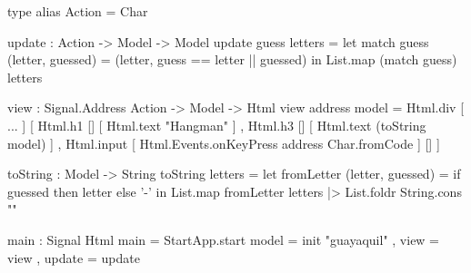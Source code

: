 \documentclass[spanish]{beamer}
\begin{document}

\begin{frame}[fragile]
  \begin{code}
type alias Action =
  Char
  \end{code}
\end{frame}


\begin{frame}[fragile]
  \begin{code}
update : Action -> Model -> Model
update guess letters =
  let
    match guess (letter, guessed) =
      (letter, guess == letter || guessed)
  in
    List.map (match guess) letters
  \end{code}
\end{frame}


\begin{frame}[fragile]
  \begin{code}
view : Signal.Address Action -> Model -> Html
view address model =
  Html.div
    [ ... ]
    [ Html.h1 [] [ Html.text "Hangman" ]
    , Html.h3 [] [ Html.text (toString model) ]
    , Html.input
        [ Html.Events.onKeyPress address Char.fromCode ]
        []
    ]
  \end{code}
\end{frame}


\begin{frame}[fragile]
  \begin{code}
toString : Model -> String
toString letters =
  let
    fromLetter (letter, guessed) =
      if guessed then letter else '-'
  in
    List.map fromLetter letters
      |> List.foldr String.cons ""
  \end{code}
\end{frame}


\begin{frame}[fragile]
  \begin{code}
main : Signal Html
main =
  StartApp.start
    { model = init "guayaquil"
    , view = view
    , update = update
    }
  \end{code}
\end{frame}
\end{document}
